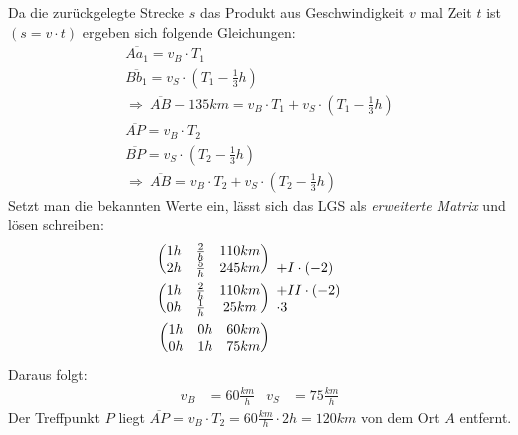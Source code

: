 Da die zurückgelegte Strecke $\displaystyle s$ das Produkt aus Geschwindigkeit $\displaystyle v$ mal Zeit $\displaystyle t$ ist $\displaystyle ( s=v\cdot t)$ ergeben sich folgende Gleichungen:
\begin{gather*}
	\overline{Aa_{1}} =v_{B} \cdot T_{1}\\
	\overline{Bb_{1}} =v_{S} \cdot \left( T_{1} -\frac{1}{3} h\right)\\
	\Rightarrow \ \overline{AB} -135km=v_{B} \cdot T_{1} +v_{S} \cdot \left( T_{1} -\frac{1}{3} h\right)\\
	\overline{AP} =v_{B} \cdot T_{2}\\
	\overline{BP} =v_{S} \cdot \left( T_{2} -\frac{1}{3} h\right)\\
	\Rightarrow \ \overline{AB} =v_{B} \cdot T_{2} +v_{S} \cdot \left( T_{2} -\frac{1}{3} h\right)
\end{gather*}
Setzt man die bekannten Werte ein, lässt sich das LGS als \textit{erweiterte Matrix} und lösen schreiben:
\begin{align*}
	\begin{pmatrix}
		1h & \frac{2} h & 110km\\
		2h & \frac{5} h & 245km
	\end{pmatrix} & \begin{array}{ l c }
		& \\
		+I\cdot ( -2) & 
	\end{array}\\
	\begin{pmatrix}
		1h & \frac{2} h & 110km\\
		0h & \frac{1} h & 25km
	\end{pmatrix} & \begin{array}{ l c }
		+II\cdot ( -2) & \\
		\cdot 3 & 
	\end{array}\\
	\begin{pmatrix}
		1h & 0h & 60km\\
		0h & 1h & 75km
	\end{pmatrix} & 
\end{align*}
Daraus folgt:
\begin{align*}
	v_{B} & =60\frac{km}{h} & v_{S} & =75\frac{km}{h}
\end{align*}
Der Treffpunkt $\displaystyle P$ liegt $\displaystyle \overline{AP} =v_{B} \cdot T_{2} =60\frac{km}{h} \cdot 2h=120km$ von dem Ort $\displaystyle A$ entfernt.
